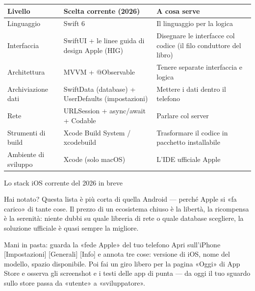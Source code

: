 
\begin{center}
\begin{tabularx}{\linewidth}{|X|X|X|}
\hline
\textbf{Livello} & \textbf{Scelta corrente (2026)} & \textbf{A cosa serve} \tabularnewline
\hline
Linguaggio & Swift 6 & Il linguaggio per la logica \tabularnewline
Interfaccia & SwiftUI + le linee guida di design Apple (HIG) & Disegnare le interfacce col codice (il filo conduttore del libro) \tabularnewline
Architettura & MVVM + @Observable & Tenere separate interfaccia e logica \tabularnewline
Archiviazione dati & SwiftData (database) + UserDefaults (impostazioni) & Mettere i dati dentro il telefono \tabularnewline
Rete & URLSession + async/await + Codable & Parlare col server \tabularnewline
Strumenti di build & Xcode Build System / xcodebuild & Trasformare il codice in pacchetto installabile \tabularnewline
Ambiente di sviluppo & Xcode (solo macOS) & L'IDE ufficiale Apple \tabularnewline
\hline
\end{tabularx}
\end{center}

\begin{center}\small\color{gray}Lo stack iOS corrente del 2026 in breve\end{center}

Hai notato? Questa lista è più corta di quella Android — perché Apple si «fa carico» di tante cose. Il prezzo di un ecosistema chiuso è la libertà, la ricompensa è la serenità: niente dubbi su quale libreria di rete o quale database scegliere, la soluzione ufficiale è quasi sempre la migliore.

\begin{tcbpractice}{Mani in pasta: guarda la «fede Apple» del tuo telefono}
Apri sull'iPhone [Impostazioni] [Generali] [Info] e annota tre cose: versione di iOS, nome del modello, spazio disponibile. Poi fai un giro libero per la pagina «Oggi» di App Store e osserva gli screenshot e i testi delle app di punta — da oggi il tuo sguardo sullo store passa da «utente» a «sviluppatore».

\end{tcbpractice}

